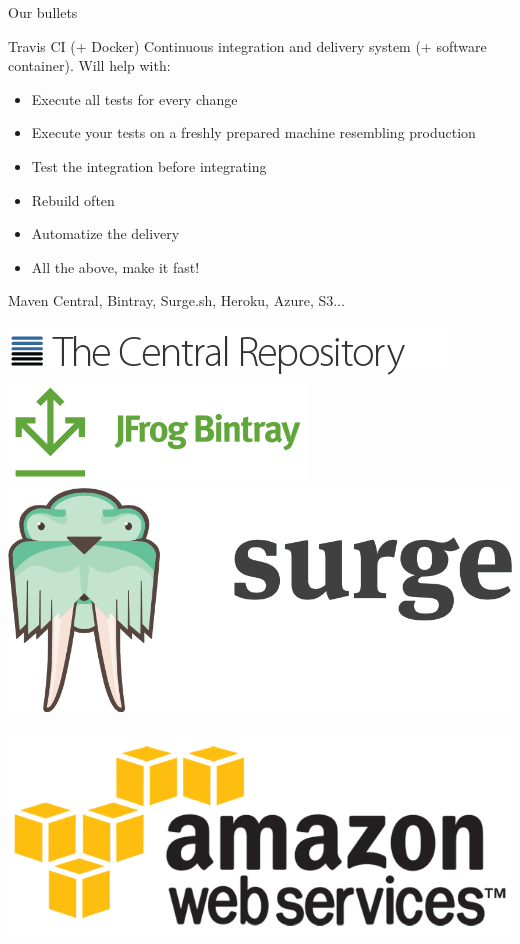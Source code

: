 \documentclass[presentation]{beamer}
\begin{document}
\begin{frame}{Our bullets}
\begin{block}{Travis CI (+ Docker)}
		Continuous integration and delivery system (+ software container). Will help with:
		\begin{itemize}
			\item Execute all tests for every change
			\item Execute your tests on a freshly prepared machine resembling production
			\item Test the integration before integrating
			\item Rebuild often
			\item Automatize the delivery
			\item All the above, make it fast!
		\end{itemize}
	\end{block}
	\begin{block}{Maven Central, Bintray, Surge.sh, Heroku, Azure, S3...}
		\begin{center}
			\includegraphics[height=.08\textheight]{images/central-logo} \\ 
			\includegraphics[height=.1\textheight]{images/bintray-logo} ~ 
 			\includegraphics[height=.1\textheight]{images/surge-logo} ~ 
 			\includegraphics[height=.1\textheight]{images/s3-logo} ~ 
		\end{center}


\end{block}
\end{frame}
\end{document}
